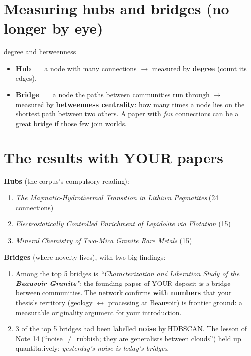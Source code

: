 \documentclass[11pt,a4paper]{article}
\begin{document}
\section{Measuring hubs and bridges (no longer by eye)}

\begin{concepto}{degree and betweenness}
\begin{itemize}
  \item \textbf{Hub} $=$ a node with many connections $\rightarrow$ measured by
        \textbf{degree} (count its edges).
  \item \textbf{Bridge} $=$ a node the paths between communities run through $\rightarrow$
        measured by \textbf{betweenness centrality}: how many times a node lies on the
        shortest path between two others. A paper with \emph{few} connections can be a great
        bridge if those few join worlds.
\end{itemize}
\end{concepto}

\section{The results with YOUR papers}

\textbf{Hubs} (the corpus's compulsory reading):
\begin{enumerate}
  \item \emph{The Magmatic-Hydrothermal Transition in Lithium Pegmatites} (24 connections)
  \item \emph{Electrostatically Controlled Enrichment of Lepidolite via Flotation} (15)
  \item \emph{Mineral Chemistry of Two-Mica Granite Rare Metals} (15)
\end{enumerate}

\textbf{Bridges} (where novelty lives), with two big findings:
\begin{enumerate}
  \item Among the top 5 bridges is \emph{``Characterization and Liberation Study of the
        \textbf{Beauvoir Granite}''}: the founding paper of YOUR deposit is a bridge between
        communities. The network confirms \textbf{with numbers} that your thesis's territory
        (geology $\leftrightarrow$ processing at Beauvoir) is frontier ground: a measurable
        originality argument for your introduction.
  \item 3 of the top 5 bridges had been labelled \textbf{noise} by HDBSCAN. The lesson of Note
        14 (``noise $\neq$ rubbish; they are generalists between clouds'') held up
        quantitatively: \emph{yesterday's noise is today's bridges}.
\end{enumerate}
\end{document}
